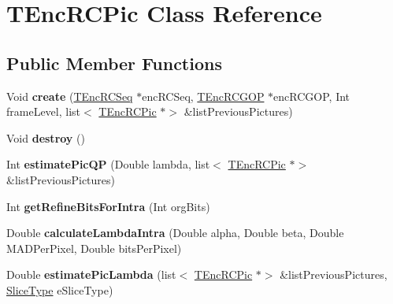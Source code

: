 \hypertarget{class_t_enc_r_c_pic}{}\section{T\+Enc\+R\+C\+Pic Class Reference}
\label{class_t_enc_r_c_pic}
\subsection*{Public Member Functions}
\begin{DoxyCompactItemize}
\item 
\mbox{\label{class_t_enc_r_c_pic_a0add6616c32365a7f031d4e840daee94}} 
Void {\bfseries create} (\hyperlink{class_t_enc_r_c_seq}{T\+Enc\+R\+C\+Seq} $\ast$enc\+R\+C\+Seq, \hyperlink{class_t_enc_r_c_g_o_p}{T\+Enc\+R\+C\+G\+OP} $\ast$enc\+R\+C\+G\+OP, Int frame\+Level, list$<$ \hyperlink{class_t_enc_r_c_pic}{T\+Enc\+R\+C\+Pic} $\ast$$>$ \&list\+Previous\+Pictures)
\item 
\mbox{\label{class_t_enc_r_c_pic_a86cbee143adba9ccff2f33f05dff94e4}} 
Void {\bfseries destroy} ()
\item 
\mbox{\label{class_t_enc_r_c_pic_ab5e6cec96418656e30ee5062fcdea1f1}} 
Int {\bfseries estimate\+Pic\+QP} (Double lambda, list$<$ \hyperlink{class_t_enc_r_c_pic}{T\+Enc\+R\+C\+Pic} $\ast$$>$ \&list\+Previous\+Pictures)
\item 
\mbox{\label{class_t_enc_r_c_pic_ad2501987ac57e508667948e4cdff1a50}} 
Int {\bfseries get\+Refine\+Bits\+For\+Intra} (Int org\+Bits)
\item 
\mbox{\label{class_t_enc_r_c_pic_a3ef88007452f8e81803c020e310ced85}} 
Double {\bfseries calculate\+Lambda\+Intra} (Double alpha, Double beta, Double M\+A\+D\+Per\+Pixel, Double bits\+Per\+Pixel)
\item 
\mbox{\label{class_t_enc_r_c_pic_abf41dbe8e788f5dab0de6a78fd153198}} 
Double {\bfseries estimate\+Pic\+Lambda} (list$<$ \hyperlink{class_t_enc_r_c_pic}{T\+Enc\+R\+C\+Pic} $\ast$$>$ \&list\+Previous\+Pictures, \hyperlink{_type_def_8h_a8fc5fd31653a387f7430d29863620f71}{Slice\+Type} e\+Slice\+Type)
\item 
$$
\end{DoxyCompactItemize}
